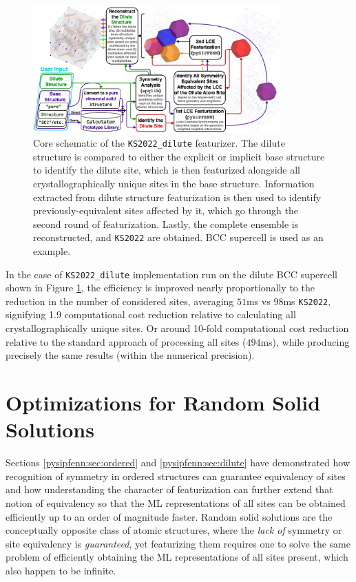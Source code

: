 \begin{figure}[h]
    \centering
    \includegraphics[width=0.85\textwidth]{KS2022_dilute.png}
    \caption{Core schematic of the \texttt{KS2022\_dilute} featurizer. The dilute structure is compared to either the explicit or implicit base structure to identify the dilute site, which is then featurized alongside all crystallographically unique sites in the base structure. Information extracted from dilute structure featurization is then used to identify previously-equivalent sites affected by it, which go through the second round of featurization. Lastly, the complete ensemble is reconstructed, and \texttt{KS2022} are obtained. BCC supercell is used as an example.}
    \label{pysipfenn:fig:KS2022dilute}
\end{figure}

In the case of \texttt{KS2022\_dilute} implementation run on the dilute BCC supercell shown in Figure \ref{pysipfenn:fig:KS2022dilute}, the efficiency is improved nearly proportionally to the reduction in the number of considered sites, averaging $51$ms vs $98$ms \texttt{KS2022}, signifying 1.9 computational cost reduction relative to calculating all crystallographically unique sites. Or around 10-fold computational cost reduction relative to the standard \cite{Ward2017, Chen2019GraphCrystals, Jha2019IRNet, Krajewski2022ExtensibleNetworks, Choudhary2021AtomisticPredictions, Deng2023CHGNetModelling, Davariashtiyani2023FormationRepresentation, Schmidt2023Machine-Learning-AssistedMaterials} approach of processing all sites ($494$ms), while producing precisely the same results (within the numerical precision).


\section{Optimizations for Random Solid Solutions} \label{pysipfenn:sec:randomsolutions}

Sections \ref{pysipfenn:sec:ordered} and \ref{pysipfenn:sec:dilute} have demonstrated how recognition of symmetry in ordered structures can guarantee equivalency of sites and how understanding the character of featurization can further extend that notion of equivalency so that the ML representations of all sites can be obtained efficiently up to an order of magnitude faster. Random solid solutions are the conceptually opposite class of atomic structures, where the \emph{lack of} symmetry or site equivalency is \emph{guaranteed}, yet featurizing them requires one to solve the same problem of efficiently obtaining the ML representations of all sites present, which also happen to be infinite.

